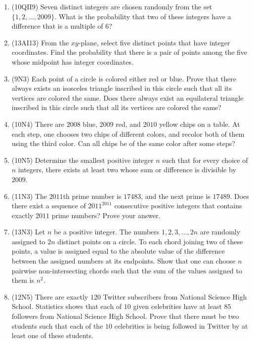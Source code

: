 \documentclass[10pt,paper=letter]{scrartcl}
\begin{document}
\begin{enumerate}

\item (10QII9) Seven distinct integers are chosen randomly from the set $\{1, 2, \ldots, 2009\}$. What is the probability that two of these integers have a difference that is a multiple of $6$?

\item (13AI13) From the $xy$-plane, select five distinct points that have integer coordinates. Find the probability that there is a pair of points among the five whose midpoint has integer coordinates.

\item (9N3) Each point of a circle is colored either red or blue. Prove that there always exists an isosceles triangle inscribed in this circle such that all its vertices are colored the same. Does there always exist an equilateral triangle inscribed in this circle such that all its vertices are colored the same?

\item (10N4) There are $2008$ blue, $2009$ red, and $2010$ yellow chips on a table. At each step, one chooses two chips of different colors, and recolor both of them using the third color. Can all chips be of the same color after some steps?

\item (10N5) Determine the smallest positive integer $n$ such that for every choice of $n$ integers, there exists at least two whose sum or difference is divisible by $2009$.

\item (11N3) The $2011$th prime number is $17483$, and the next prime is $17489$. Does there exist a sequence of $2011^{2011}$ consecutive positive integers that contains exactly $2011$ prime numbers? Prove your answer.

\item (13N3) Let $n$ be a positive integer. The numbers $1, 2, 3, \ldots, 2n$ are randomly assigned to $2n$ distinct points on a circle. To each chord joining two of these points, a value is assigned equal to the absolute value of the difference between the assigned numbers at its endpoints. Show that one can choose $n$ pairwise non-intersecting chords such that the sum of the values assigned to them is $n^2$.

\item (12N5) There are exactly $120$ Twitter subscribers from National Science High School. Statistics shows that each of $10$ given celebrities have at least $85$ followers from National Science High School. Prove that there must be two students such that each of the $10$ celebrities is being followed in Twitter by at least one of these students.

\end{enumerate}
\end{document}
